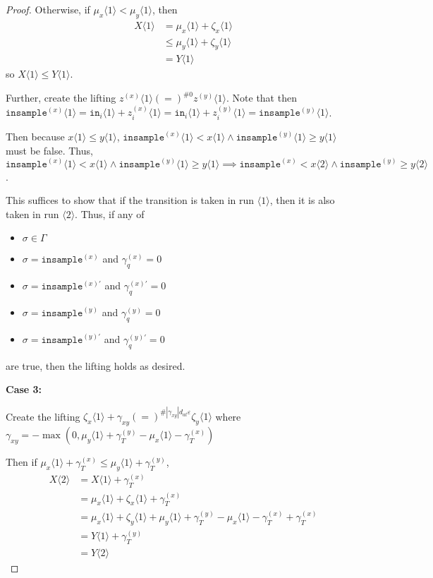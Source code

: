 \documentclass[12pt]{article}
\newcommand{\brangle}[1]{\langle #1 \rangle}
\theoremstyle{definition}
\begin{document}
\begin{proof}
    Otherwise, if $\mu_x\brangle{1}<\mu_y\brangle{1}$, then \begin{align*}
        X\brangle{1}&= \mu_x\brangle{1} + \zeta_x\brangle{1}\\
        &\leq \mu_y\brangle{1}+\zeta_y\brangle{1}\\
        &=Y\brangle{1}
    \end{align*}
    so $X\brangle{1}\leq Y\brangle{1}$.

    Further, create the lifting $z^{(x)}\brangle{1}(=)^{\#0}z^{(y)}\brangle{1}$. Note that then $\texttt{insample}^{(x)}\brangle{1}=\texttt{in}_i\brangle{1} + z_i^{(x)}\brangle{1} =\texttt{in}_i\brangle{1} + z_i^{(y)}\brangle{1}=\texttt{insample}^{(y)}\brangle{1}$.

    Then because $x\brangle{1} \leq y\brangle{1}$, $\texttt{insample}^{(x)}\brangle{1}<x\brangle{1}\land\texttt{insample}^{(y)}\brangle{1}\geq y\brangle{1}$ must be false. Thus, $\texttt{insample}^{(x)}\brangle{1}<x\brangle{1}\land\texttt{insample}^{(y)}\brangle{1}\geq y\brangle{1}\implies \texttt{insample}^{(x)}<x\brangle{2}\land\texttt{insample}^{(y)}\geq y\brangle{2}$.

    This suffices to show that if the transition is taken in run $\brangle{1}$, then it is also taken in run $\brangle{2}$. Thus, if any of \begin{itemize}
        \item $\sigma \in \Gamma$
        \item $\sigma = \texttt{insample}^{(x)}$ and $\gamma_q^{(x)}=0$ 
        \item $\sigma = \texttt{insample}^{(x)\prime}$ and $\gamma_q^{(x)\prime}=0$ 
        \item $\sigma = \texttt{insample}^{(y)}$ and $\gamma_q^{(y)}=0$
        \item $\sigma = \texttt{insample}^{(y)\prime}$ and $\gamma_q^{(y)\prime}=0$
    \end{itemize}
    are true, then the lifting holds as desired. 

    \textbf{Case 3:}
    
    Create the lifting $\zeta_x\brangle{1} + \gamma_{xy} (=)^{\#|\gamma_{xy}|d_{at}\varepsilon} \zeta_y\brangle{1}$ where $\gamma_{xy} = -\max(0, \mu_y\brangle{1}+ \gamma_T^{(y)}-\mu_x\brangle{1}-\gamma_T^{(x)})$

    Then if $\mu_x\brangle{1}+\gamma_T^{(x)}\leq \mu_y\brangle{1}+\gamma_T^{(y)}$, \begin{align*}
        X\brangle{2} &= X\brangle{1} + \gamma_T^{(x)}\\
        &=\mu_x\brangle{1} + \zeta_x\brangle{1} + \gamma_T^{(x)}\\
        &=\mu_x\brangle{1} +\zeta_y\brangle{1} + \mu_y\brangle{1}+ \gamma_T^{(y)}-\mu_x\brangle{1}-\gamma_T^{(x)} +\gamma_T^{(x)}\\
        &=Y\brangle{1} + \gamma_T^{(y)}\\
        &= Y\brangle{2}
    \end{align*}


\end{proof}
\end{document}
